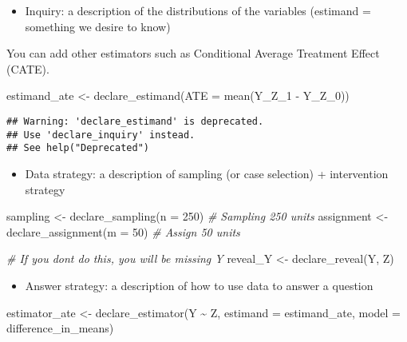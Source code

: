 \documentclass[
]{book}
\newenvironment{Shaded}{\begin{snugshade}}{\end{snugshade}}
\newcommand{\AttributeTok}[1]{\textcolor[rgb]{0.77,0.63,0.00}{#1}}
\newcommand{\CommentTok}[1]{\textcolor[rgb]{0.56,0.35,0.01}{\textit{#1}}}
\newcommand{\DecValTok}[1]{\textcolor[rgb]{0.00,0.00,0.81}{#1}}
\newcommand{\FunctionTok}[1]{\textcolor[rgb]{0.00,0.00,0.00}{#1}}
\newcommand{\NormalTok}[1]{#1}
\newcommand{\OtherTok}[1]{\textcolor[rgb]{0.56,0.35,0.01}{#1}}
\newcommand{\SpecialCharTok}[1]{\textcolor[rgb]{0.00,0.00,0.00}{#1}}
\providecommand{\tightlist}{%
  \setlength{\itemsep}{0pt}\setlength{\parskip}{0pt}}
\begin{document}
\begin{itemize}
\tightlist
\item
  Inquiry: a description of the distributions of the variables (estimand = something we desire to know)
\end{itemize}

You can add other estimators such as Conditional Average Treatment Effect (CATE).

\begin{Shaded}
\begin{Highlighting}[]
\NormalTok{estimand\_ate }\OtherTok{\textless{}{-}} \FunctionTok{declare\_estimand}\NormalTok{(}\AttributeTok{ATE =} \FunctionTok{mean}\NormalTok{(Y\_Z\_1 }\SpecialCharTok{{-}}\NormalTok{ Y\_Z\_0))}
\end{Highlighting}
\end{Shaded}

\begin{verbatim}
## Warning: 'declare_estimand' is deprecated.
## Use 'declare_inquiry' instead.
## See help("Deprecated")
\end{verbatim}

\begin{itemize}
\tightlist
\item
  Data strategy: a description of sampling (or case selection) + intervention strategy
\end{itemize}

\begin{Shaded}
\begin{Highlighting}[]
\NormalTok{sampling }\OtherTok{\textless{}{-}} \FunctionTok{declare\_sampling}\NormalTok{(}\AttributeTok{n =} \DecValTok{250}\NormalTok{) }\CommentTok{\# Sampling 250 units }
\NormalTok{assignment }\OtherTok{\textless{}{-}} \FunctionTok{declare\_assignment}\NormalTok{(}\AttributeTok{m =} \DecValTok{50}\NormalTok{) }\CommentTok{\# Assign 50 units }

\CommentTok{\# If you don\textquotesingle{}t do this, you will be missing Y }
\NormalTok{reveal\_Y }\OtherTok{\textless{}{-}} \FunctionTok{declare\_reveal}\NormalTok{(Y, Z)}
\end{Highlighting}
\end{Shaded}

\begin{itemize}
\tightlist
\item
  Answer strategy: a description of how to use data to answer a question
\end{itemize}

\begin{Shaded}
\begin{Highlighting}[]
\NormalTok{estimator\_ate }\OtherTok{\textless{}{-}} \FunctionTok{declare\_estimator}\NormalTok{(Y }\SpecialCharTok{\textasciitilde{}}\NormalTok{ Z, }
                                   \AttributeTok{estimand =}\NormalTok{ estimand\_ate,}
                                   \AttributeTok{model =}\NormalTok{ difference\_in\_means)}
\end{Highlighting}
\end{Shaded}
\end{document}
